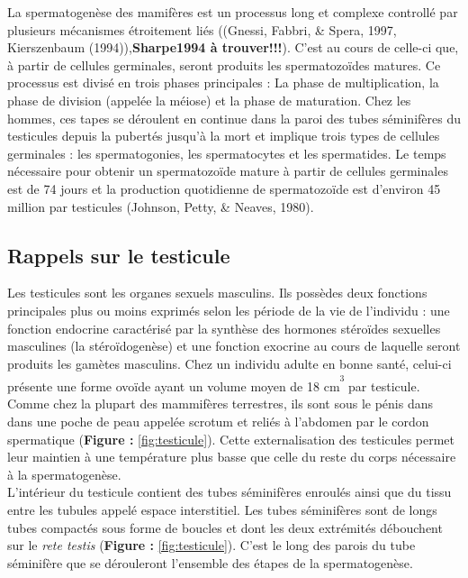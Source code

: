 \documentclass[12pt,twoside]{reedthesis}
\theoremstyle{definition}
\theoremstyle{definition}
\theoremstyle{remark}
\begin{document}
  La spermatogenèse des mamifères est un processus long et complexe
  controllé par plusieurs mécanismes étroitement liés ((Gnessi, Fabbri, \&
  Spera, 1997, Kierszenbaum (1994)),\textbf{Sharpe1994 à trouver!!!}).
  C'est au cours de celle-ci que, à partir de cellules germinales, seront
  produits les spermatozoïdes matures. Ce processus est divisé en trois
  phases principales : La phase de multiplication, la phase de division
  (appelée la méiose) et la phase de maturation. Chez les hommes, ces
  tapes se déroulent en continue dans la paroi des tubes séminifères du
  testicules depuis la pubertés jusqu'à la mort et implique trois types de
  cellules germinales : les spermatogonies, les spermatocytes et les
  spermatides. Le temps nécessaire pour obtenir un spermatozoïde mature à
  partir de cellules germinales est de 74 jours et la production
  quotidienne de spermatozoïde est d'environ 45 million par testicules
  (Johnson, Petty, \& Neaves, 1980).
  
  \subsection{Rappels sur le testicule}\label{rappels-sur-le-testicule}
  
  Les testicules sont les organes sexuels masculins. Ils possèdes deux
  fonctions principales plus ou moins exprimés selon les période de la vie
  de l'individu : une fonction endocrine caractérisé par la synthèse des
  hormones stéroïdes sexuelles masculines (la stéroïdogenèse) et une
  fonction exocrine au cours de laquelle seront produits les gamètes
  masculins. Chez un individu adulte en bonne santé, celui-ci présente une
  forme ovoïde ayant un volume moyen de 18
  cm\textsuperscript{\textsuperscript{3}} par testicule. Comme chez la
  plupart des mammifères terrestres, ils sont sous le pénis dans dans une
  poche de peau appelée scrotum et reliés à l'abdomen par le cordon
  spermatique (\textbf{Figure :} \ref{fig:testicule}). Cette
  externalisation des testicules permet leur maintien à une température
  plus basse que celle du reste du corps nécessaire à la spermatogenèse.\\
  L'intérieur du testicule contient des tubes séminifères enroulés ainsi
  que du tissu entre les tubules appelé espace interstitiel. Les tubes
  séminifères sont de longs tubes compactés sous forme de boucles et dont
  les deux extrémités débouchent sur le \emph{rete testis} (\textbf{Figure
  :} \ref{fig:testicule}). C'est le long des parois du tube séminifère que
  se dérouleront l'ensemble des étapes de la spermatogenèse.
  
\end{document}
